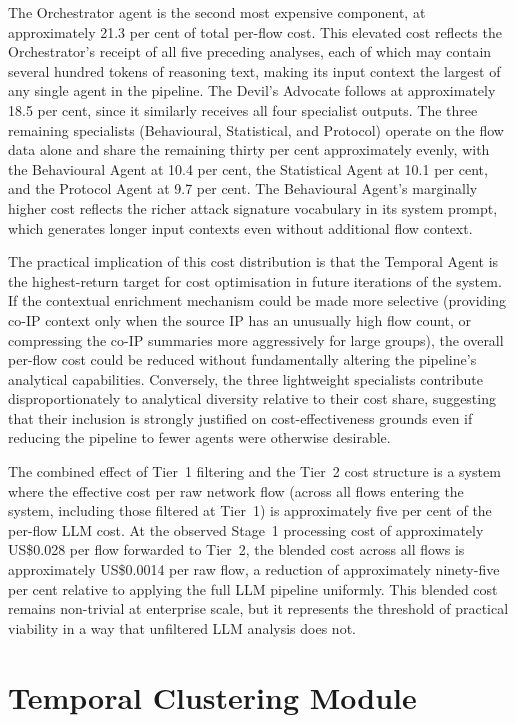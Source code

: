 \documentclass[../main.tex]{subfiles}
\begin{document}
The Orchestrator agent is the second most expensive component, at approximately 21.3 per cent of total per-flow cost. This elevated cost reflects the Orchestrator's receipt of all five preceding analyses, each of which may contain several hundred tokens of reasoning text, making its input context the largest of any single agent in the pipeline. The Devil's Advocate follows at approximately 18.5 per cent, since it similarly receives all four specialist outputs. The three remaining specialists (Behavioural, Statistical, and Protocol) operate on the flow data alone and share the remaining thirty per cent approximately evenly, with the Behavioural Agent at 10.4 per cent, the Statistical Agent at 10.1 per cent, and the Protocol Agent at 9.7 per cent. The Behavioural Agent's marginally higher cost reflects the richer attack signature vocabulary in its system prompt, which generates longer input contexts even without additional flow context.

The practical implication of this cost distribution is that the Temporal Agent is the highest-return target for cost optimisation in future iterations of the system. If the contextual enrichment mechanism could be made more selective (providing co-IP context only when the source IP has an unusually high flow count, or compressing the co-IP summaries more aggressively for large groups), the overall per-flow cost could be reduced without fundamentally altering the pipeline's analytical capabilities. Conversely, the three lightweight specialists contribute disproportionately to analytical diversity relative to their cost share, suggesting that their inclusion is strongly justified on cost-effectiveness grounds even if reducing the pipeline to fewer agents were otherwise desirable.

The combined effect of Tier~1 filtering and the Tier~2 cost structure is a system where the effective cost per raw network flow (across all flows entering the system, including those filtered at Tier~1) is approximately five per cent of the per-flow LLM cost. At the observed Stage~1 processing cost of approximately US\$0.028 per flow forwarded to Tier~2, the blended cost across all flows is approximately US\$0.0014 per raw flow, a reduction of approximately ninety-five per cent relative to applying the full LLM pipeline uniformly. This blended cost remains non-trivial at enterprise scale, but it represents the threshold of practical viability in a way that unfiltered LLM analysis does not.

\section{Temporal Clustering Module}
\label{sec:temporal-clustering}
\end{document}
